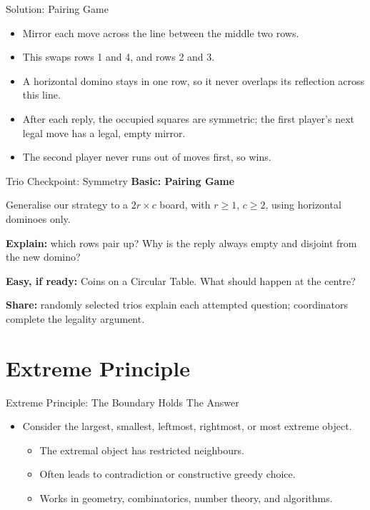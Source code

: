\documentclass{beamer}
\begin{document}
\begin{frame}{Solution: Pairing Game}
    \pause
    \begin{itemize}
        \item Mirror each move across the line between the middle two rows.
        \item This swaps rows 1 and 4, and rows 2 and 3.
        \item A horizontal domino stays in one row, so it never overlaps
            its reflection across this line.
        \item After each reply, the occupied squares are symmetric;
            the first player's next legal move has a legal, empty mirror.
        \item The second player never runs out of moves first, so wins.
    \end{itemize}
\end{frame}

\begin{frame}{Trio Checkpoint: Symmetry}
    \textbf{Basic: Pairing Game}

    Generalise our strategy to a $2r\times c$ board, with
    $r\ge1$, $c\ge2$, using horizontal dominoes only.

    \textbf{Explain:} which rows pair up? Why is the reply always empty
    and disjoint from the new domino?

    \textbf{Easy, if ready:} Coins on a Circular Table.
    What should happen at the centre?

    \textbf{Share:} randomly selected trios explain each attempted
    question; coordinators complete the legality argument.
\end{frame}

\section{Extreme Principle}

\begin{frame}{Extreme Principle: The Boundary Holds The Answer}
    \pause
    \begin{itemize}
        \item Consider the largest, smallest, leftmost, rightmost, or
            most extreme object.
            \begin{itemize}
                \item The extremal object has restricted neighbours.
                \item Often leads to contradiction or constructive
                    greedy choice.
                \item Works in geometry, combinatorics, number
                    theory, and algorithms.
            \end{itemize}
    \end{itemize}
\end{frame}
\end{document}
